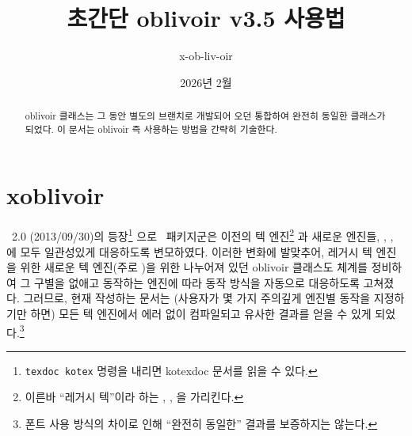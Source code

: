 \documentclass[
	12pt,
	a4paper,
	kosection,
	footnote,
	microtype,
	figtabcapt,
]{oblivoir}
\newcommand\xobclass{x\-ob\-liv\-oir\oblivoirallowbreak}
\newcommand\obclass{ob\-liv\-oir\oblivoirallowbreak}
\begin{document}
\title{초간단 \obclass{} v3.5 사용법}

\date{2026년 2월}

\author{x-ob-liv-oir}

\maketitle

\begin{abstract}
\obclass{} 클래스는 그 동안 별도의 브랜치로 개발되어 오던
  통합하여 완전히 동일한 클래스가 되었다.
이 문서는 \obclass{} 즉 
사용하는 방법을 간략히 기술한다.
\end{abstract}

\tableofcontents*

\clearpage

\section{ \xobclass{}}


\koTeX\ 2.0 (2013/09/30)의 등장\footnote{%
	\texttt{texdoc kotex} 명령을 내리면 kotexdoc 문서를 읽을 수 있다.}%
으로 \koTeX\ 패키지군은 이전의 텍 엔진\footnote{%
	이른바 ``레거시 텍''이라 하는 , , 을
	가리킨다.}%
과 새로운 엔진들, , ,
에 모두 일관성있게 대응하도록 변모하였다.
이러한 변화에 발맞추어, 레거시 텍 엔진을 위한  새로운 텍 엔진(주로 )을 위한 
나누어져 있던 oblivoir 클래스도 체계를 정비하여 그 구별을 없애고 동작하는 엔진에 따라 동작 방식을
자동으로 대응하도록 고쳐졌다. 그러므로, 현재  작성하는 문서는 
(사용자가 몇 가지 주의깊게 엔진별 동작을 지정하기만 하면) 모든 텍 엔진에서 에러 없이 컴파일되고
유사한 결과를 얻을 수 있게 되었다.\footnote{%
	폰트 사용 방식의 차이로 인해 ``완전히 동일한'' 결과를 보증하지는 않는다.}
\end{document}
